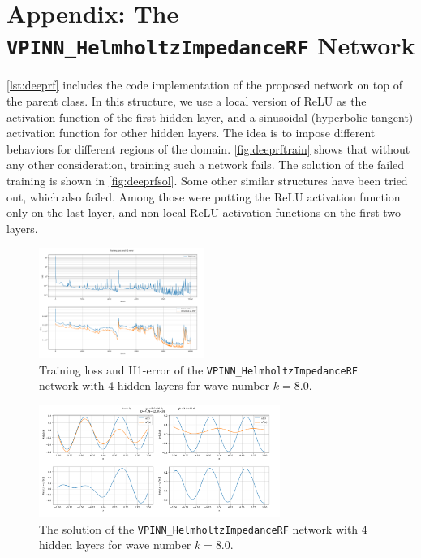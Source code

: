 \appendix

\section{Appendix: The \texttt{VPINN\_HelmholtzImpedanceRF} Network} \label{app:deeprf}
\autoref{lst:deeprf} includes the code implementation of the proposed network on top of the parent class. In this structure, we use a local version of ReLU as the activation function of the first hidden layer, and a sinusoidal (hyperbolic tangent) activation function for other hidden layers. The idea is to impose different behaviors for different regions of the domain. \autoref{fig:deeprftrain} shows that without any other consideration, training such a network fails. The solution of the failed training is shown in \autoref{fig:deeprfsol}. Some other similar structures have been tried out, which also failed. Among those were putting the ReLU activation function only on the last layer, and non-local ReLU activation functions on the first two layers.

\begin{figure}[h!]
    \centering
    \includegraphics[width = 0.48\textwidth]{img/DeepRF-D004N012K038-training.png}
    \caption{Training loss and H1-error of the \texttt{VPINN\_HelmholtzImpedanceRF} network with 4 hidden layers for wave number $k=8.0$.}
    \label{fig:deeprftrain}
\end{figure}

\begin{figure}[h!]
    \centering
    \includegraphics[width = 0.7\textwidth]{img/DeepRF-D004N012K038-sol.png}
    \caption{The solution of the \texttt{VPINN\_HelmholtzImpedanceRF} network with 4 hidden layers for wave number $k=8.0$.}
    \label{fig:deeprfsol}
\end{figure}

